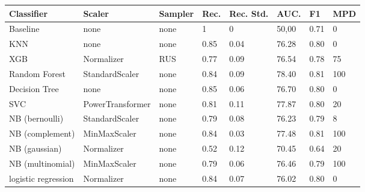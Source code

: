 
\begin{table}[]

	\begin{footnotesize}
		\begin{tabular}{|l|l|l|l|l|l|l|l|}
			\hline
			\textbf{Classifier} & \textbf{Scaler}  & \textbf{Sampler} & \textbf{Rec.} & \textbf{Rec. Std.} & \textbf{AUC.} & \textbf{F1} & \textbf{MPD} \\ \hline
			Baseline            & none             & none             & 1             & 0                  & 50,00         & 0.71        & 0            \\ \hline
			KNN                 & none             & none             & 0.85          & 0.04               & 76.28         & 0.80        & 0            \\ \hline
			XGB                 & Normalizer       & RUS              & 0.77          & 0.09               & 76.54         & 0.78        & 75           \\ \hline
			Random Forest       & StandardScaler   & none             & 0.84          & 0.09               & 78.40         & 0.81        & 100          \\ \hline
			Decision Tree       & none             & none             & 0.85          & 0.06               & 76.70         & 0.80        & 0            \\ \hline
			SVC                 & PowerTransformer & none             & 0.81          & 0.11               & 77.87         & 0.80        & 20           \\ \hline
			NB (bernoulli)      & StandardScaler   & none             & 0.79          & 0.08               & 76.23         & 0.79        & 8            \\ \hline
			NB (complement)     & MinMaxScaler     & none             & 0.84          & 0.03               & 77.48         & 0.81        & 100          \\ \hline
			NB (gaussian)       & Normalizer       & none             & 0.52          & 0.12               & 70.45         & 0.64        & 20           \\ \hline
			NB (multinomial)    & MinMaxScaler     & none             & 0.79          & 0.06               & 76.46         & 0.79        & 100          \\ \hline
			logistic regression & Normalizer       & none             & 0.84          & 0.07               & 76.02         & 0.80        & 0            \\ \hline
		\end{tabular}


\end{footnotesize}
\end{table}
